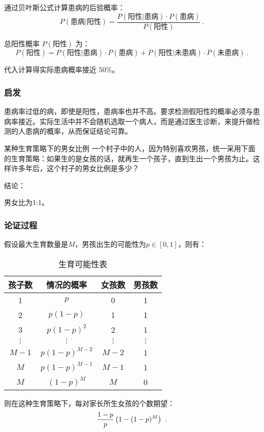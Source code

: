 通过贝叶斯公式计算患病的后验概率：
$$
P(\text{患病}|\text{阳性}) = \frac{P(\text{阳性}|\text{患病}) \cdot P(\text{患病})}{P(\text{阳性})}~.
$$

总阳性概率 $P(\text{阳性})$ 为：
$$
P(\text{阳性}) = P(\text{阳性}|\text{患病}) \cdot P(\text{患病}) + P(\text{阳性}|\text{未患病}) \cdot P(\text{未患病})~.
$$

代入计算得实际患病概率接近 $50\%$。

\subsubsection{启发}

患病率过低的病，即使是阳性，患病率也并不高。要求检测假阳性的概率必须与患病率接近。实际生活中并不会随机选取一个病人，而是通过医生诊断，来提升做检测的人患病的概率，从而保证结论可靠。
\begin{example}{某种生育策略下的男女比例}
一个村子中的人，因为特别喜欢男孩，统一采用下面的生育策略：如果生的是女孩的话，就再生一个孩子，直到生出一个男孩为止。这样许多年后，这个村子的男女比例是多少？
\end{example}



结论：

男女比为1:1。

\subsubsection{论证过程}


假设最大生育数量是$M$，男孩出生的可能性为$p\in[0,1]$，则有：

\begin{table}[ht]
\centering
\caption{生育可能性表}\label{tab_CitPrb1}
\begin{tabular}{|c|c|c|c|}
\hline
孩子数 & 情况的概率 & 女孩数 & 男孩数 \\
\hline
1 & $p$ & 0 & 1 \\
\hline
2 & $p(1-p)$ & 1 & 1 \\
\hline
3 & $p(1-p)^2$ & 2 & 1 \\
\hline
$\vdots$ & $\vdots$ & $\vdots$ & $\vdots$ \\
\hline
$M-1$ & $p(1-p)^{M-2}$ & $M-2$ & 1 \\
\hline
$M$ & $p(1-p)^{M-1}$ & $M-1$ & 1 \\
\hline
$M$ & $(1-p)^M$ & $M$ & 0 \\
\hline
\end{tabular}
\end{table}
则在这种生育策略下，每对家长所生女孩的个数期望：
\begin{equation}
{1-p\over p}\left(1-(1-p)^M\right)~.
\end{equation}

